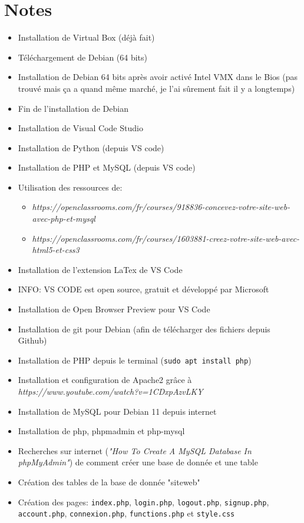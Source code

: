 \documentclass{article}
\begin{document}
\section*{Notes}

\begin{itemize}
\item Installation de Virtual Box (déjà fait)
\item Téléchargement de Debian (64 bits)
\item Installation de Debian 64 bits après avoir activé Intel VMX dans le Bios (pas trouvé mais ça a quand même marché, je l’ai sûrement fait il y a longtemps)
\item Fin de l’installation de Debian
\item Installation de Visual Code Studio
\item Installation de Python (depuis VS code)
\item Installation de PHP et MySQL (depuis VS code)
\item Utilisation des ressources de:
\begin{itemize}
\item \textit{https://openclassrooms.com/fr/courses/918836-concevez-votre-site-web-avec-php-et-mysql}
\item \textit{https://openclassrooms.com/fr/courses/1603881-creez-votre-site-web-avec-html5-et-css3}
\end{itemize}
\item Installation de l'extension LaTex de VS Code
\item INFO: VS CODE est open source, gratuit et développé par Microsoft
\item Installation de Open Browser Preview pour VS Code
\item Installation de git pour Debian (afin de télécharger des fichiers depuis Github)
\item Installation de PHP depuis le terminal (\texttt{sudo apt install php})
\item Installation et configuration de Apache2 grâce à \textit{https://www.youtube.com/watch?v=1CDxpAzvLKY}
\item Installation de MySQL pour Debian 11 depuis internet
\item Installation de php, phpmadmin et php-mysql
\item Recherches sur internet (\textit{"How To Create A MySQL Database In phpMyAdmin"}) de comment créer une base de donnée et une table
\item Création des tables de la base de donnée "siteweb"
\item Création des pages: \texttt{index.php}, \texttt{login.php}, \texttt{logout.php}, \texttt{signup.php}, \texttt{account.php}, \texttt{connexion.php}, \texttt{functions.php} et \texttt{style.css}
\end{itemize}
\end{document}

